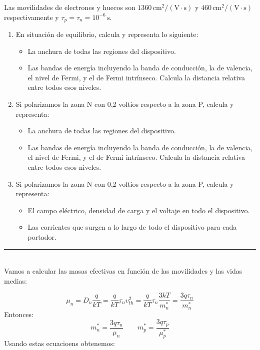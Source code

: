Las movilidades de electrones y huecos son \(1360 \, \text{cm}^2/(\text{V}\cdot\text{s})\) y \(460 \, \text{cm}^2/(\text{V}\cdot\text{s})\) respectivamente y \(\tau_p = \tau_n = 10^{-6} \, \text{s}\).

\begin{enumerate}[label=\alph*)]
\item En situación de equilibrio, calcula y representa lo siguiente:
\begin{itemize}
    \item La anchura de todas las regiones del dispositivo.
    \item Las bandas de energía incluyendo la banda de conducción, la de valencia, el nivel de Fermi, y el de Fermi intrínseco. Calcula la distancia relativa entre todos esos niveles.
\end{itemize}

\item Si polarizamos la zona N con 0,2 voltios respecto a la zona P, calcula y representa:
\begin{itemize}
    \item La anchura de todas las regiones del dispositivo.
    \item Las bandas de energía incluyendo la banda de conducción, la de valencia, el nivel de Fermi, y el de Fermi intrínseco. Calcula la distancia relativa entre todos esos niveles.
\end{itemize}

\item Si polarizamos la zona N con 0,2 voltios respecto a la zona P, calcula y representa:
\begin{itemize}
    \item El campo eléctrico, densidad de carga y el voltaje en todo el dispositivo.
    \item Las corrientes que surgen a lo largo de todo el dispositivo para cada portador.
\end{itemize}
\end{enumerate}


\rule{\textwidth}{0.1pt} \\[2pt]

Vamos a calcular las masas efectivas en función de las movilidades y las vidas medias:

\begin{equation}
    \mu_n = D_n \frac{q}{kT} = \frac{q}{kT} \tau_n v^2_{th} = \frac{q}{kT} \tau_n \frac{3kT}{m_n^*} = \frac{3q\tau_n}{m_n^*}
\end{equation}
Entonces:
\begin{equation}
    m_n^* = \frac{3q\tau_n}{\mu_n} \qquad m_p^* = \frac{3q\tau_p}{\mu_p^*}
\end{equation}
Usando estas ecuacioens obtenemos:

